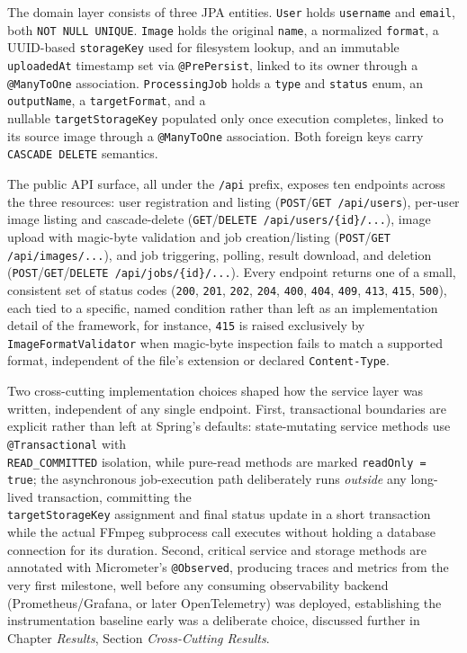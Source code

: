\documentclass[twoside]{supsistudent}
\begin{document}
The domain layer consists of three JPA entities. \texttt{User} holds \texttt{username} and \texttt{email}, both \texttt{NOT NULL UNIQUE}. \texttt{Image} holds the original \texttt{name}, a normalized \texttt{format}, a UUID-based \texttt{storageKey} used for filesystem lookup, and an immutable \texttt{uploadedAt} timestamp set via \texttt{@PrePersist}, linked to its owner through a \texttt{@ManyToOne} association. \texttt{ProcessingJob} holds a \texttt{type} and \texttt{status} enum, an \texttt{outputName}, a \texttt{targetFormat}, and a \\ nullable \texttt{targetStorageKey} populated only once execution completes, linked to its source image through a \texttt{@ManyToOne} association. Both foreign keys carry \texttt{CASCADE DELETE} semantics.

The public API surface, all under the \texttt{/api} prefix, exposes ten endpoints across the three resources: user registration and listing (\texttt{POST}/\texttt{GET /api/users}), per-user image listing and cascade-delete (\texttt{GET}/\texttt{DELETE /api/users/\{id\}/...}), image upload with magic-byte validation and job creation/listing (\texttt{POST}/\texttt{GET /api/images/...}), and job triggering, polling, result download, and deletion (\texttt{POST}/\texttt{GET}/\texttt{DELETE /api/jobs/\{id\}/...}). Every endpoint returns one of a small, consistent set of status codes (\texttt{200}, \texttt{201}, \texttt{202}, \texttt{204}, \texttt{400}, \texttt{404}, \texttt{409}, \texttt{413}, \texttt{415}, \texttt{500}), each tied to a specific, named condition rather than left as an implementation detail of the framework, for instance, \texttt{415} is raised exclusively by \texttt{ImageFormatValidator} when magic-byte inspection fails to match a supported format, independent of the file's extension or declared \texttt{Content-Type}. 

Two cross-cutting implementation choices shaped how the service layer was written, independent of any single endpoint. First, transactional boundaries are explicit rather than left at Spring's defaults: state-mutating service methods use \texttt{@Transactional} with \\ \texttt{READ\_COMMITTED} isolation, while pure-read methods are marked \texttt{readOnly = true}; the asynchronous job-execution path deliberately runs \emph{outside} any long-lived transaction, committing the \\ \texttt{targetStorageKey} assignment and final status update in a short transaction while the actual FFmpeg subprocess call executes without holding a database connection for its duration. Second, critical service and storage methods are annotated with Micrometer's \texttt{@Observed}, producing traces and metrics from the very first milestone, well before any consuming observability backend (Prometheus/Grafana, or later OpenTelemetry) was deployed, establishing the instrumentation baseline early was a deliberate choice, discussed further in Chapter \emph{Results}, Section \emph{Cross-Cutting Results}.
\end{document}
